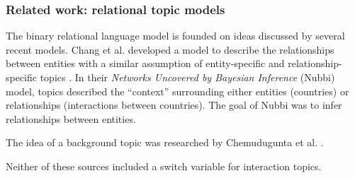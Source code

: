 \subsubsection{Related work: relational topic models}
The binary relational language model is founded on ideas discussed by
several recent models.  Chang et al. developed a model to describe the
relationships between entities with a similar assumption of
entity-specific and relationship-specific topics
\cite{chang:2009nubbi}.  In their \emph{Networks Uncovered by Bayesian
  Inference} (Nubbi) model, topics described the ``context''
surrounding either entities (countries) or relationships (interactions
between countries).  The goal of Nubbi was to infer relationships
between entities.

The idea of a background topic was researched by
Chemudugunta et al. \cite{chemudugunta:2009}.

Neither of these sources included a switch variable for interaction topics.

